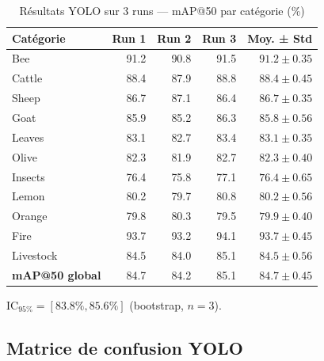 \documentclass[12pt,a4paper,twoside]{report}
\begin{document}
\begin{table}[H]
\centering
\caption{Résultats YOLO sur 3 runs — mAP@50 par catégorie (\%)}
\label{tab:yolo_runs}
\begin{tabular}{lrrrr}
\toprule
\textbf{Catégorie} & \textbf{Run 1} & \textbf{Run 2} & \textbf{Run 3} & \textbf{Moy. ± Std} \\
\midrule
Bee        & 91.2 & 90.8 & 91.5 & $91.2 \pm 0.35$ \\
Cattle     & 88.4 & 87.9 & 88.8 & $88.4 \pm 0.45$ \\
Sheep      & 86.7 & 87.1 & 86.4 & $86.7 \pm 0.35$ \\
Goat       & 85.9 & 85.2 & 86.3 & $85.8 \pm 0.56$ \\
Leaves     & 83.1 & 82.7 & 83.4 & $83.1 \pm 0.35$ \\
Olive      & 82.3 & 81.9 & 82.7 & $82.3 \pm 0.40$ \\
Insects    & 76.4 & 75.8 & 77.1 & $76.4 \pm 0.65$ \\
Lemon      & 80.2 & 79.7 & 80.8 & $80.2 \pm 0.56$ \\
Orange     & 79.8 & 80.3 & 79.5 & $79.9 \pm 0.40$ \\
Fire       & 93.7 & 93.2 & 94.1 & $93.7 \pm 0.45$ \\
Livestock  & 84.5 & 84.0 & 85.1 & $84.5 \pm 0.56$ \\
\midrule
\textbf{mAP@50 global} & 84.7 & 84.2 & 85.1 & $\bm{84.7 \pm 0.45}$ \\
\bottomrule
\end{tabular}
\end{table}

$\text{IC}_{95\%} = [83.8\%, 85.6\%]$ (bootstrap, $n=3$).

\subsection{Matrice de confusion YOLO}
\end{document}
